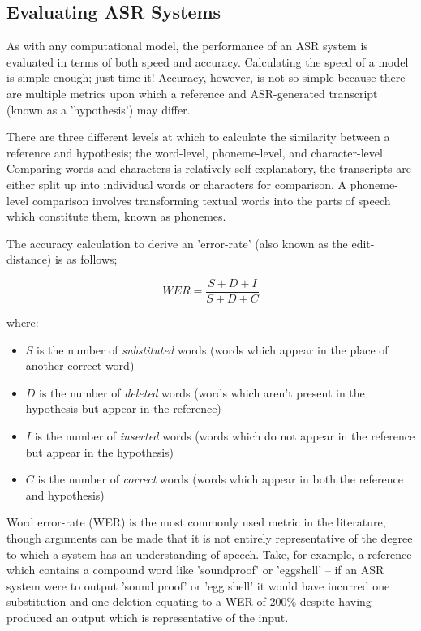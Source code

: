 \subsection{Evaluating ASR Systems}
As with any computational model, the performance of an ASR system is evaluated in terms of both speed and accuracy.
Calculating the speed of a model is simple enough; just time it!
Accuracy, however, is not so simple because there are multiple metrics upon which a reference and ASR-generated transcript (known as a 'hypothesis') may differ.

There are three different levels at which to calculate the similarity between a reference and hypothesis; the word-level, phoneme-level, and character-level\cite{fang2020}
Comparing words and characters is relatively self-explanatory, the transcripts are either split up into individual words or characters for comparison.
A phoneme-level comparison involves transforming textual words into the parts of speech which constitute them, known as phonemes.

The accuracy calculation to derive an 'error-rate' (also known as the edit-distance\cite{niessen2000evaluation}) is as follows;

\[WER = \frac{S + D + I}{S + D + C}\]

where:

\begin{itemize}
  \item $S$ is the number of \emph{substituted} words (words which appear in the place of another correct word)
  \item $D$ is the number of \emph{deleted} words (words which aren't present in the hypothesis but appear in the reference)
  \item $I$ is the number of \emph{inserted} words (words which do not appear in the reference but appear in the hypothesis)
  \item $C$ is the number of \emph{correct} words (words which appear in both the reference and hypothesis)
\end{itemize}

Word error-rate (WER) is the most commonly used metric in the literature\cite{park2008empirical}, though arguments can be made that it is not entirely representative of the degree to which a system has an understanding of speech.
Take, for example, a reference which contains a compound word like 'soundproof' or 'eggshell' -- if an ASR system were to output 'sound proof' or 'egg shell' it would have incurred one substitution and one deletion equating to a WER of 200\% despite having produced an output which is representative of the input.

